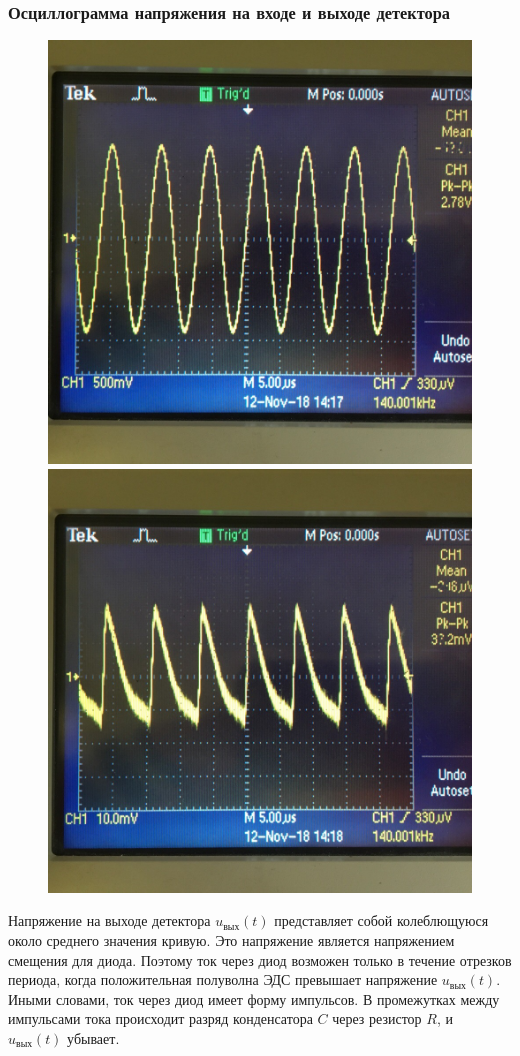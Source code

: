 \subsubsection{Осциллограмма напряжения на входе и выходе детектора}
\begin{figure}[h!]
	\begin{minipage}{0.49\linewidth}
		\centering
		\includegraphics[width=0.8\linewidth]{photo/311.jpg}
		\caption{}
		\label{photo:3.1.1}
	\end{minipage}
	\begin{minipage}{0.49\linewidth}
		\centering
		\includegraphics[width=0.8\linewidth]{photo/312.jpg}
		\caption{}
		\label{photo:3.1.2}
	\end{minipage}
\end{figure}
Напряжение на выходе детектора $u_\text{вых}(t)$ представляет собой колеблющуюся около среднего значения кривую. Это напряжение является напряжением смещения для диода. Поэтому ток через диод возможен только в течение отрезков периода, когда положительная полуволна ЭДС превышает напряжение $u_\text{вых}(t)$. Иными словами, ток через диод имеет форму импульсов. В промежутках между импульсами тока происходит разряд конденсатора $C$ через резистор $R$, и $u_\text{вых}(t)$ убывает.
